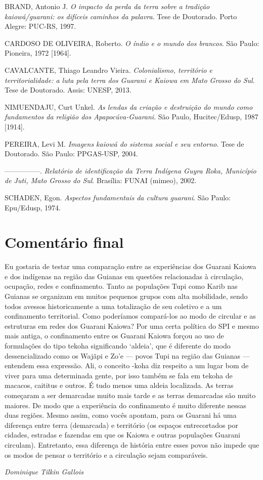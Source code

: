 BRAND, Antonio J. \emph{O impacto da perda da terra sobre a tradição
kaiowá/guarani: os difíceis caminhos da palavra}. Tese de Doutorado.
Porto Alegre: PUC-RS, 1997.

CARDOSO DE OLIVEIRA, Roberto. \emph{O índio e o mundo dos brancos}. São Paulo:
Pioneira, 1972 [1964].

CAVALCANTE, Thiago Leandro Vieira. \emph{Colonialismo, território e
territorialidade: a luta pela terra dos Guarani e Kaiowa em Mato Grosso
do Sul}. Tese de Doutorado. Assis: UNESP, 2013.

NIMUENDAJU, Curt Unkel. \emph{As lendas da criação e destruição do mundo como
fundamentos da religião dos Apapocúva-Guarani}. São Paulo,
Hucitec/Edusp, 1987 [1914].

PEREIRA, Levi M. \emph{Imagens kaiowá do sistema social e seu entorno}. Tese de
Doutorado. São Paulo: PPGAS-USP, 2004.

—————. \emph{Relatório de identificação da Terra Indígena Guyra Roka,
Município de Juti, Mato Grosso do Sul}. Brasília: FUNAI (mimeo), 2002.

SCHADEN, Egon. \emph{Aspectos fundamentais da cultura guarani}. São Paulo:
Epu/Edusp, 1974.

\section{Comentário final}
Eu gostaria de testar uma comparação entre as experiências dos Guarani
Kaiowa e dos indígenas na região das Guianas em questões relacionadas à
circulação, ocupação, redes e confinamento. Tanto as populações Tupi
como Karib nas Guianas se organizam em muitos pequenos grupos com alta
mobilidade, sendo todos avessos historicamente a uma totalização de seu
coletivo e a um confinamento territorial. Como poderíamos compará-los
ao modo de circular e as estruturas em redes dos Guarani Kaiowa? Por
uma certa política do SPI e mesmo mais antiga, o confinamento entre os
Guarani Kaiowa forçou ao uso de formulações do tipo tekoha significando
‘aldeia’, que é diferente do modo dessencializado como os Wajãpi e Zo’e
— povos Tupi na região das Guianas — entendem essa expressão. Ali, o
conceito -koha diz respeito a um lugar bom de viver para uma
determinada gente, por isso também se fala em tekoha de macacos,
caititus e outros. É tudo menos uma aldeia localizada. As terras
começaram a ser demarcadas muito mais tarde e as terras demarcadas são
muito maiores. De modo que a experiência do confinamento é muito
diferente nessas duas regiões. Mesmo assim, como vocês apontam, para os
Guarani há uma diferença entre terra (demarcada) e território (os
espaços entrecortados por cidades, estradas e fazendas em que os Kaiowa
e outras populações Guarani circulam). Entretanto, essa diferença de
história entre esses povos não impede que os modos de pensar o
território e a circulação sejam comparáveis. 
\medskip
\begin{flushright}
\emph{Dominique Tilkin Gallois}
\end{flushright}

